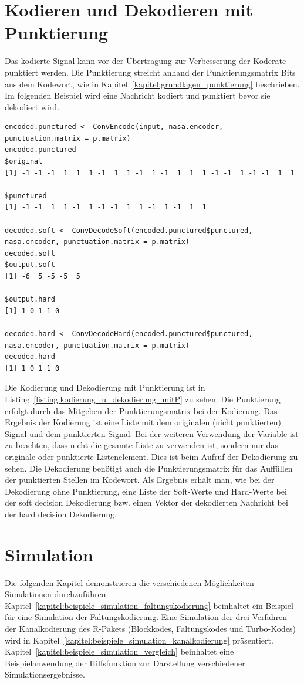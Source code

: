 \section{Kodieren und Dekodieren mit Punktierung}
\label{kapitel:beispiele_kodieren_mitP}
Das kodierte Signal kann vor der Übertragung zur Verbesserung der Koderate punktiert werden. Die Punktierung streicht anhand der Punktierungsmatrix Bits aus dem Kodewort, wie in Kapitel~\ref{kapitel:grundlagen_punktierung} beschrieben. Im folgenden Beispiel wird eine Nachricht kodiert und punktiert bevor sie dekodiert wird.
\begin{lstlisting}[caption=Kodierung und Dekodierung mit Punktierung, label={listing:kodierung_u_dekodierung_mitP}, float=!th]
encoded.punctured <- ConvEncode(input, nasa.encoder, punctuation.matrix = p.matrix)
encoded.punctured
$original
[1] -1 -1 -1  1  1  1 -1  1  1 -1  1 -1  1  1  1 -1 -1  1 -1 -1  1  1

$punctured
[1] -1 -1  1  1 -1  1 -1 -1  1  1 -1  1 -1  1  1

decoded.soft <- ConvDecodeSoft(encoded.punctured$punctured, nasa.encoder, punctuation.matrix = p.matrix)
decoded.soft
$output.soft
[1] -6  5 -5 -5  5

$output.hard
[1] 1 0 1 1 0

decoded.hard <- ConvDecodeHard(encoded.punctured$punctured, nasa.encoder, punctuation.matrix = p.matrix)
decoded.hard
[1] 1 0 1 1 0
\end{lstlisting}
Die Kodierung und Dekodierung mit Punktierung ist in Listing~\ref{listing:kodierung_u_dekodierung_mitP} zu sehen. Die Punktierung erfolgt durch das Mitgeben der Punktierungsmatrix bei der Kodierung. Das Ergebnis der Kodierung ist eine Liste mit dem originalen (nicht punktierten) Signal und dem punktierten Signal. Bei der weiteren Verwendung der Variable ist zu beachten, dass nicht die gesamte Liste zu verwenden ist, sondern nur das originale oder punktierte Listenelement. Dies ist beim Aufruf der Dekodierung zu sehen. Die Dekodierung benötigt auch die Punktierungsmatrix für das Auffüllen der punktierten Stellen im Kodewort. Als Ergebnis erhält man, wie bei der Dekodierung ohne Punktierung, eine Liste der Soft-Werte und Hard-Werte bei der soft decision Dekodierung bzw. einen Vektor der dekodierten Nachricht bei der hard decision Dekodierung.

\section{Simulation}
\label{kapitel:beispiele_simulation}
Die folgenden Kapitel demonstrieren die verschiedenen Möglichkeiten Simulationen durchzuführen. Kapitel~\ref{kapitel:beispiele_simulation_faltungskodierung} beinhaltet ein Beispiel für eine Simulation der Faltungskodierung. Eine Simulation der drei Verfahren der Kanalkodierung des R-Pakets (Blockkodes, Faltungskodes und Turbo-Kodes) wird in Kapitel~\ref{kapitel:beispiele_simulation_kanalkodierung} präsentiert. Kapitel~\ref{kapitel:beispiele_simulation_vergleich} beinhaltet eine Beispielanwendung der Hilfsfunktion zur Darstellung verschiedener Simulationsergebnisse.

